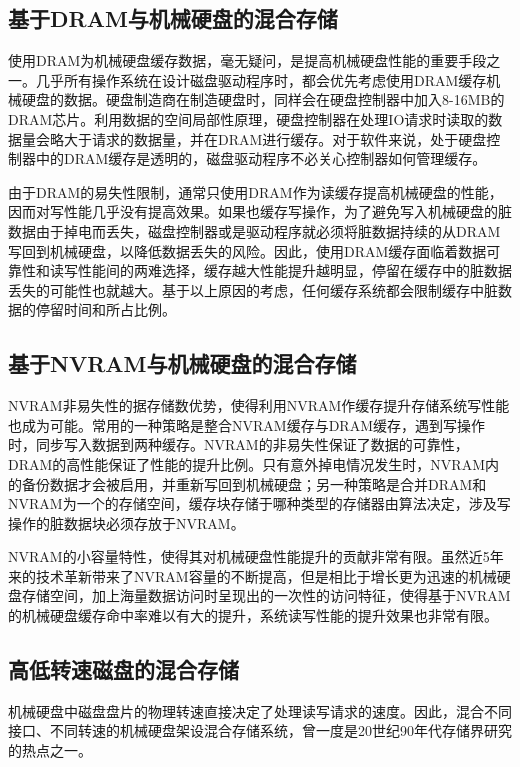 \subsection{基于DRAM与机械硬盘的混合存储}

使用DRAM为机械硬盘缓存数据\cite{sdramcache2002}，毫无疑问，是提高机械硬盘性能的重要手段之一。几乎所有操作系统在设计磁盘驱动程序时，都会优先考虑使用DRAM缓存机械硬盘的数据。硬盘制造商在制造硬盘时，同样会在硬盘控制器中加入8-16MB的DRAM芯片。利用数据的空间局部性原理，硬盘控制器在处理IO请求时读取的数据量会略大于请求的数据量，并在DRAM进行缓存。对于软件来说，处于硬盘控制器中的DRAM缓存是透明的，磁盘驱动程序不必关心控制器如何管理缓存。

由于DRAM的易失性限制，通常只使用DRAM作为读缓存提高机械硬盘的性能，因而对写性能几乎没有提高效果。如果也缓存写操作，为了避免写入机械硬盘的脏数据由于掉电而丢失，磁盘控制器或是驱动程序就必须将脏数据持续的从DRAM写回到机械硬盘，以降低数据丢失的风险。因此，使用DRAM缓存面临着数据可靠性和读写性能间的两难选择，缓存越大性能提升越明显，停留在缓存中的脏数据丢失的可能性也就越大。基于以上原因的考虑，任何缓存系统都会限制缓存中脏数据的停留时间和所占比例。

\subsection{基于NVRAM与机械硬盘的混合存储}

NVRAM非易失性的据存储数优势，使得利用NVRAM作缓存提升存储系统写性能也成为可能。常用的一种策略是整合NVRAM缓存与DRAM缓存\cite{nvramcache2013}，遇到写操作时，同步写入数据到两种缓存。NVRAM的非易失性保证了数据的可靠性，DRAM的高性能保证了性能的提升比例。只有意外掉电情况发生时，NVRAM内的备份数据才会被启用，并重新写回到机械硬盘；另一种策略是合并DRAM和NVRAM为一个的存储空间，缓存块存储于哪种类型的存储器由算法决定，涉及写操作的脏数据块必须存放于NVRAM。

NVRAM的小容量特性，使得其对机械硬盘性能提升的贡献非常有限。虽然近5年来的技术革新带来了NVRAM容量的不断提高，但是相比于增长更为迅速的机械硬盘存储空间，加上海量数据访问时呈现出的一次性的访问特征，使得基于NVRAM的机械硬盘缓存命中率难以有大的提升，系统读写性能的提升效果也非常有限。

\subsection{高低转速磁盘的混合存储}

机械硬盘中磁盘盘片的物理转速直接决定了处理读写请求的速度。因此，混合不同接口、不同转速的机械硬盘架设混合存储系统，曾一度是20世纪90年代存储界研究的热点之一。

